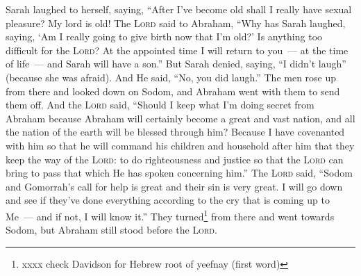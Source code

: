 \begin{inparaenum}
     Sarah laughed to herself, saying, ``After I've become old shall I really have sexual pleasure? My lord is old!%
     The \textsc{Lord} said to Abraham, ``Why has Sarah laughed, saying, `Am I really going to give birth now that I'm old?'%
     Is anything too difficult for the \textsc{Lord}? At the appointed time I will return to you~--- at the time of life~--- and Sarah will have a son.''%
     But Sarah denied, saying, ``I didn't laugh'' (because she was afraid). And He said, ``No, you did laugh.''%
     The men rose up from there and looked down on Sodom, and Abraham went with them to send them off.%
     And the \textsc{Lord} said, ``Should I keep what I'm doing secret from Abraham%
     because Abraham will certainly become a great and vast nation, and all the nation of the earth will be blessed through him?%
     Because I have covenanted with him so that he will command his children and household after him that they keep the way of the \textsc{Lord}: to do righteousness and justice so that the \textsc{Lord} can bring to pass that which He has spoken concerning him.''%
     The \textsc{Lord} said, ``Sodom and Gomorrah's call for help is great and their sin is very great.%
     I will go down and see if they've done everything according to the cry that is coming up to Me~--- and if not, I will know it.''%
     They turned\footnote{xxxx check Davidson for Hebrew root of yeefnay (first word)} from there and went towards Sodom, but Abraham still stood before the \textsc{Lord}.%

\end{inparaenum}
